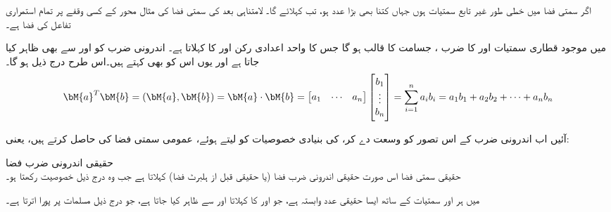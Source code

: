 اگر سمتی فضا   میں  خطی طور غیر تابع  سمتیات ہوں جہاں  کتنا بھی بڑا عدد ہو، تب   کہلائے گا۔ لامتناہی بعد کی  سمتی فضا کی مثال  محور کے کسی وقفے  پر تمام استمراری تفاعل کی فضا ہے۔ 

 میں موجود قطاری سمتیات  اور  کا ضرب ، جسامت  کا قالب ہو گا جس کا واحد اعدادی رکن  اور  کا  کہلاتا ہے۔ اندرونی ضرب کو  اور  سے بھی ظاہر کیا جاتا ہے اور یوں اس کو   بھی کہتے ہیں۔اس طرح درج ذیل ہو گا۔
\begin{align}
\bM{a}^T\bM{b}=(\bM{a},\bM{b})=\bM{a}\cdot \bM{b}=\begin{bmatrix} a_1&\cdots&a_n \end{bmatrix} \begin{bmatrix}b_1\\\vdots\\ b_n  \end{bmatrix}=\sum_{i=1}^{n}a_i b_i=a_1b_1+a_2b_2+\cdots+a_nb_n
\end{align}

آئیں اب اندرونی ضرب کے اس تصور کو وسعت دے کر،  کی بنیادی خصوصیات کو لیتے ہوئے، عمومی سمتی فضا کی   حاصل کرتے ہیں، یعنی:

\quad حقیقی اندرونی ضرب فضا\\
حقیقی سمتی فضا  اس صورت حقیقی اندرونی ضرب فضا (یا حقیقی قبل از ہلبرٹ فضا) کہلاتا ہے جب وہ درج ذیل خصوصیت رکھتا ہو۔

 میں ہر  اور  سمتیات کے ساتھ ایسا حقیقی عدد وابستہ ہے، جو  اور  کا  کہلاتا اور  سے ظاہر کیا جاتا ہے،  جو درج ذیل  مسلمات پر پورا اترتا ہے۔
 
